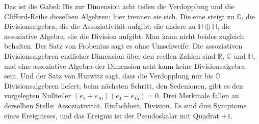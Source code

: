 \documentclass[11pt,a4paper]{article}
\newcommand{\R}{\mathbb R}
\newcommand{\C}{\mathbb C}
\newcommand{\HH}{\mathbb H}
\newcommand{\Oc}{\mathbb O}
\begin{document}
Das ist die Gabel: Bis zur Dimension acht teilen die Verdopplung und die Clifford-Reihe dieselben Algebren; hier trennen sie sich. Die eine steigt zu $\Oc$, die Divisionsalgebra, die die Assoziativität aufgibt; die andere zu $\HH\oplus\HH$, die assoziative Algebra, die die Division aufgibt. Man kann nicht beides zugleich behalten. Der Satz von Frobenius sagt es ohne Umschweife: Die assoziativen Divisionsalgebren endlicher Dimension über den reellen Zahlen sind $\R$, $\C$ und $\HH$, und eine assoziative Algebra der Dimension acht kann keine Divisionsalgebra sein. Und der Satz von Hurwitz sagt, dass die Verdopplung nur bis $\Oc$ Divisionsalgebren liefert; beim nächsten Schritt, den Sedenionen, gibt es den vorgelegten Nullteiler $(e_1+e_{10})(e_4-e_{15})=0$. Drei Merkmale fallen an derselben Stelle: Assoziativität, Einfachheit, Division. Es sind drei Symptome eines Ereignisses, und das Ereignis ist der Pseudoskalar mit Quadrat $+1$.
\end{document}

